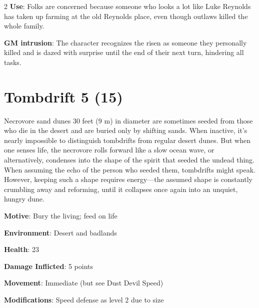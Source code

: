 \begin{multicols}{2}
\textbf{Use}: Folks are concerned because someone who looks a lot like Luke Reynolds has taken up farming at the old Reynolds place, even though outlaws killed the whole family.

\textbf{GM intrusion}: The character recognizes the risen as someone they personally killed and is dazed with surprise until the end of their next turn, hindering all tasks.

\section{Tombdrift 5 (15)}

Necrovore sand dunes 30 feet (9 m) in diameter are sometimes seeded from those who die in the desert and are buried only by shifting sands. When inactive, it’s nearly impossible to distinguish tombdrifts from regular desert dunes. But when one senses life, the necrovore rolls forward like a slow ocean wave, or alternatively, condenses into the shape of the spirit that seeded the undead thing. When assuming the echo of the person who seeded them, tombdrifts might speak. However, keeping such a shape requires energy—the assumed shape is constantly crumbling away and reforming, until it collapses once again into an unquiet, hungry dune.

\textbf{Motive}: Bury the living; feed on life

\textbf{Environment}: Desert and badlands

\textbf{Health}: 23

\textbf{Damage Inflicted}: 5 points

\textbf{Movement}: Immediate (but see Dust Devil Speed)

\textbf{Modifications}: Speed defense as level 2 due to size


\end{multicols}
